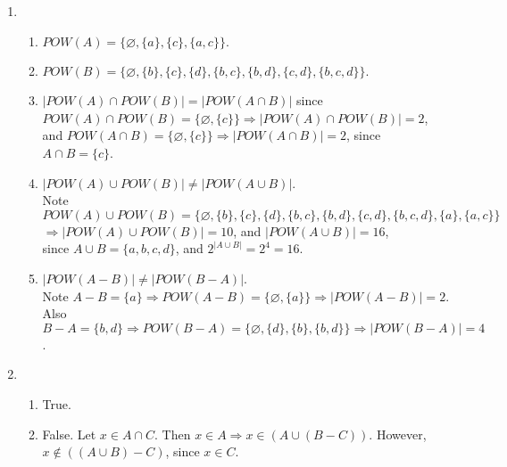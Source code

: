 \documentclass[10pt]{article}
\theoremstyle{plain}
\theoremstyle{definition}
\begin{document}
\maketitle

\begin{enumerate}

\item 

\begin{enumerate}

\item $POW(A) = \{\diameter, \{a\},\{c\},\{a,c\}\}$. 

\item $POW(B) = \{\diameter, \{b\}, \{c\},\{d\},\{b,c\},\{b,d\},\{c,d\},\{b,c,d\} \}. $

\item $|POW(A) \cap POW(B)| = |POW(A \cap B)|$ since $POW(A) \cap POW(B) = \{\diameter,\{c\}\} \Rightarrow |POW(A) \cap POW(B)| = 2$, and $POW(A \cap B) = \{\diameter, \{c\}\} \Rightarrow |POW(A \cap B)| = 2$, since $A \cap B = \{c\}$. 

\item  $|POW(A) \cup POW(B)| \neq |POW(A \cup B)|$. \\ 
Note  $POW(A) \cup POW(B) =  \{\diameter, \{b\}, \{c\},\{d\},\{b,c\},\{b,d\},\{c,d\},\{b,c,d\} , \{a\},\{a,c\}\}$ \\ 
$ \Rightarrow |POW(A) \cup POW(B)| = 10$, and $|POW(A \cup B)| = 16$,\\ since $A \cup B = \{a,b,c,d\}$, and $2^{|A \cup B|} = 2^4 = 16$.  

\item $|POW(A - B)| \neq |POW(B - A)|$. \\
Note $A - B = \{a\} \Rightarrow POW(A - B) = \{\diameter, \{a\}\} \Rightarrow |POW(A - B)| = 2$. Also $B - A = \{b,d\} \Rightarrow POW(B - A) = \{\diameter, \{d\},\{b\},\{b,d\}\} \Rightarrow |POW(B - A)| = 4$. 

\end{enumerate}

\item 

\begin{enumerate}

\item True. 

\item False. Let $x \in A \cap C$. Then $x \in A \Rightarrow x \in (A \cup (B - C))$. However, $x \notin ((A \cup B) - C)$, since $x \in C$. 


\end{enumerate}
\end{enumerate}
\end{document}

